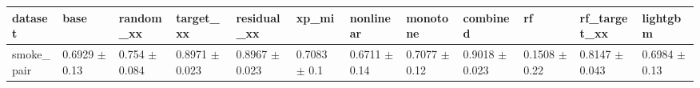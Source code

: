 \begin{tabular}{llllllllllll}
\toprule
dataset & base & random\_xx & target\_xx & residual\_xx & xp\_mi & nonlinear & monotone & combined & rf & rf\_target\_xx & lightgbm \\
\midrule
smoke\_pair & 0.6929 $\pm$ 0.13 & 0.754 $\pm$ 0.084 & 0.8971 $\pm$ 0.023 & 0.8967 $\pm$ 0.023 & 0.7083 $\pm$ 0.1 & 0.6711 $\pm$ 0.14 & 0.7077 $\pm$ 0.12 & 0.9018 $\pm$ 0.023 & 0.1508 $\pm$ 0.22 & 0.8147 $\pm$ 0.043 & 0.6984 $\pm$ 0.13 \\
\bottomrule
\end{tabular}
